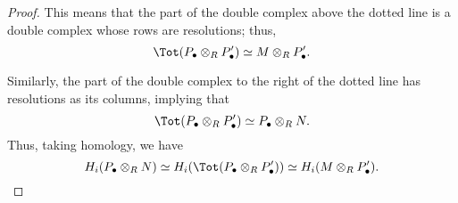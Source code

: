 \documentclass[main.tex]{subfiles}
\begin{document}
\begin{proof}
  This means that the part of the double complex above the dotted line is a double complex whose rows are resolutions; thus,
  \begin{equation*}
    \Tot(P_{\bullet} \otimes_{R} P'_{\bullet}) \simeq M \otimes_{R} P'_{\bullet}.
  \end{equation*}

  Similarly, the part of the double complex to the right of the dotted line has resolutions as its columns, implying that
  \begin{equation*}
    \Tot(P_{\bullet} \otimes_{R} P'_{\bullet}) \simeq P_{\bullet} \otimes_{R} N.
  \end{equation*}
  Thus, taking homology, we have
  \begin{equation*}
    H_{i}(P_{\bullet} \otimes_{R} N) \simeq H_{i}(\Tot(P_{\bullet} \otimes_{R} P'_{\bullet})) \simeq H_{i} (M \otimes_{R} P'_{\bullet}).
  \end{equation*}
\end{proof}
\end{document}
